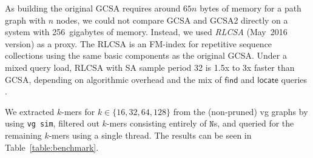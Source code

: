 \documentclass[twoside,leqno,twocolumn]{article}
\newcommand{\set}[1]{\ensuremath{\{ #1 \}}}
\newcommand{\baseN}{\mathtt{N}}
\newcommand{\find}{\ensuremath{\mathsf{find}}}
\newcommand{\locate}{\ensuremath{\mathsf{locate}}}
\newcommand{\kmer}[1]{$#1$\nobreakdash-mer}
\begin{document}
As building the original GCSA requires around $65n$ bytes of memory for a path graph with $n$ nodes, we could not compare GCSA and GCSA2 directly on a system with 256~gigabytes of memory. Instead, we used \emph{RLCSA} \cite{Maekinen2010} (May~2016 version) as a proxy. The RLCSA is an FM-index for repetitive sequence collections using the same basic components as the original GCSA. Under a mixed query load, RLCSA with SA sample period 32 is 1.5x to 3x faster than GCSA, depending on algorithmic overhead and the mix of $\find$ and $\locate$ queries \cite{Siren2014}.

We extracted \kmer{k}s for $k \in \set{16, 32, 64, 128}$ from the (non-pruned) vg graphs by using \texttt{vg sim}, filtered out \kmer{k}s consisting entirely of $\baseN$s, and queried for the remaining \kmer{k}s using a single thread. The results can be seen in Table~\ref{table:benchmark}.
\end{document}
